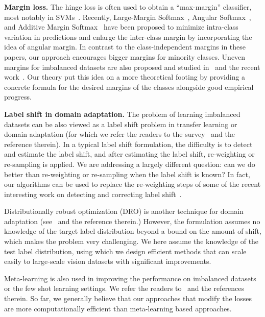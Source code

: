 \documentclass{article}
\begin{document}
\textbf{Margin loss.} The hinge loss is often used to obtain a ``max-margin'' classifier, most notably in SVMs~\citep{suykens1999least}. Recently, Large-Margin Softmax~\citep{liu2016large}, Angular Softmax~\citep{liu2017sphereface}, and Additive Margin Softmax~\citep{wang2018additive} have been proposed to minimize intra-class variation in predictions and enlarge the inter-class margin by incorporating the idea of angular margin. In contrast to the class-independent margins in these papers, our approach encourages bigger margins for minority classes. Uneven margins for imbalanced datasets are also proposed and studied in~\citep{li2002perceptron} and the recent work~\citep{khan2019striking,li2019overfitting}. Our theory put this idea on a more theoretical footing by providing a concrete formula for the desired margins of the classes alongside good empirical progress. 



\textbf{Label shift in domain adaptation.} The problem of learning imbalanced datasets can be also viewed as a label shift problem in transfer learning or domain adaptation (for which we refer the readers to the survey~\citep{wang2018deep} and the reference therein).  In a typical label shift formulation, the difficulty is to detect and estimate the label shift, and after estimating the label shift, re-weighting or re-sampling is applied. We are addressing a largely different question: can we do better than re-weighting or re-sampling when the label shift is known?  In fact, our algorithms can be used to replace the re-weighting steps of some of the recent interesting work on detecting and correcting label shift~\citep{lipton2018detecting, azizzadenesheli2018regularized}. 

Distributionally robust optimization (DRO) is another technique for domain adaptation (see~\citep{duchidistributionally,hashimoto2018fairness,carmon2019variance} and the reference therein.) However, the formulation assumes no knowledge of the target label distribution beyond a bound on the amount of shift, which makes the problem very challenging. We here assume the knowledge of the test label distribution, using which we design efficient methods that can scale easily to large-scale vision datasets with significant improvements. 

 Meta-learning is also used in improving the performance on imbalanced datasets or the few shot learning settings. We refer the readers to~\citep{wang2017learning,shu2019meta,wang2018low} and the references therein. So far, we generally believe that our approaches that modify the losses are more computationally efficient than meta-learning based approaches. 
\end{document}
